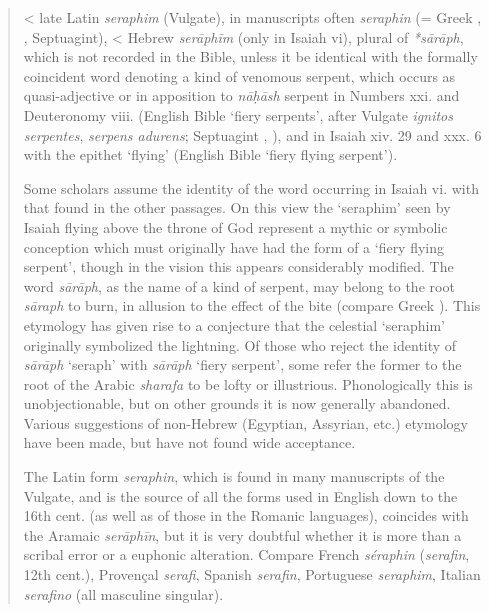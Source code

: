 			\begin{quote}
				< late Latin \textit{seraphim} (Vulgate), in manuscripts often \textit{seraphin} (= Greek , , Septuagint), < Hebrew \textit{ser\={a}ph\={i}m} (only in Isaiah vi), plural of \textit{*s\={a}r\={a}ph}, which is not recorded in the Bible, unless it be identical with the formally coincident word denoting a kind of venomous serpent, which occurs as quasi-adjective or in apposition to \textit{n\={a}\d{h}\={a}sh} serpent in Numbers xxi. and Deuteronomy viii. (English Bible `fiery serpents', after Vulgate \textit{ignitos serpentes}, \textit{serpens adurens}; Septuagint , ), and in Isaiah xiv. 29 and xxx. 6 with the epithet `flying' (English Bible `fiery flying serpent').
		
				Some scholars assume the identity of the word occurring in Isaiah vi. with that found in the other passages. On this view the `seraphim' seen by Isaiah flying above the throne of God represent a mythic or symbolic conception which must originally have had the form of a `fiery flying serpent', though in the vision this appears considerably modified. The word \textit{s\={a}r\={a}ph}, as the name of a kind of serpent, may belong to the root \textit{s\={a}raph} to burn, in allusion to the effect of the bite (compare Greek ). This etymology has given rise to a conjecture that the celestial `seraphim' originally symbolized the lightning. Of those who reject the identity of \textit{s\={a}r\={a}ph} `seraph' with \textit{s\={a}r\={a}ph} `fiery serpent', some refer the former to the root of the Arabic \textit{sharafa} to be lofty or illustrious. Phonologically this is unobjectionable, but on other grounds it is now generally abandoned. Various suggestions of non-Hebrew (Egyptian, Assyrian, etc.) etymology have been made, but have not found wide acceptance.
				 
				The Latin form \textit{seraphin}, which is found in many manuscripts of the Vulgate, and is the source of all the forms used in English down to the 16th cent. (as well as of those in the Romanic languages), coincides with the Aramaic \textit{ser\={a}ph\={i}n}, but it is very doubtful whether it is more than a scribal error or a euphonic alteration. Compare French \textit{séraphin} (\textit{serafin}, 12th cent.), Provençal \textit{serafi}, Spanish \textit{serafin}, Portuguese \textit{seraphim}, Italian \textit{serafino} (all masculine singular).
				 

\end{quote}
